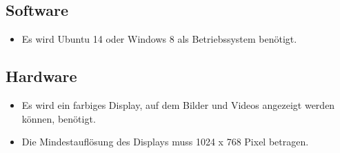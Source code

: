 \subsection{Software}
\begin{itemize}
\item Es wird Ubuntu 14 oder Windows 8 als Betriebssystem benötigt.
\end{itemize}
\subsection{Hardware}
\begin{itemize}
\item Es wird ein farbiges Display, auf dem Bilder und Videos angezeigt werden können, benötigt. 
\item Die Mindestauflösung des Displays muss 1024 x 768 Pixel betragen.
\end{itemize}
